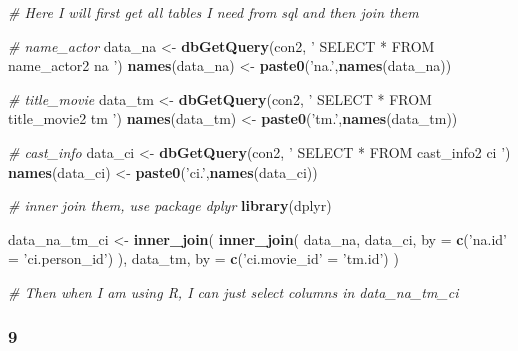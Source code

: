 \documentclass[]{article}
\newenvironment{Shaded}{\begin{snugshade}}{\end{snugshade}}
\newcommand{\KeywordTok}[1]{\textcolor[rgb]{0.13,0.29,0.53}{\textbf{{#1}}}}
\newcommand{\DataTypeTok}[1]{\textcolor[rgb]{0.13,0.29,0.53}{{#1}}}
\newcommand{\StringTok}[1]{\textcolor[rgb]{0.31,0.60,0.02}{{#1}}}
\newcommand{\CommentTok}[1]{\textcolor[rgb]{0.56,0.35,0.01}{\textit{{#1}}}}
\newcommand{\NormalTok}[1]{{#1}}
\begin{document}
\begin{Shaded}
\begin{Highlighting}[]
\CommentTok{# Here I will first get all tables I need from sql and then join them}

\CommentTok{# name_actor}
\NormalTok{data_na <-}\StringTok{ }
\StringTok{  }\KeywordTok{dbGetQuery}\NormalTok{(con2, }\StringTok{'}
\StringTok{                   SELECT *}
\StringTok{                   FROM name_actor2 na}
\StringTok{                   '}\NormalTok{)}
\KeywordTok{names}\NormalTok{(data_na) <-}\StringTok{ }\KeywordTok{paste0}\NormalTok{(}\StringTok{'na.'}\NormalTok{,}\KeywordTok{names}\NormalTok{(data_na))}

\CommentTok{# title_movie}
\NormalTok{data_tm <-}\StringTok{ }
\StringTok{  }\KeywordTok{dbGetQuery}\NormalTok{(con2, }\StringTok{'}
\StringTok{             SELECT *}
\StringTok{             FROM title_movie2 tm}
\StringTok{             '}\NormalTok{)}
\KeywordTok{names}\NormalTok{(data_tm) <-}\StringTok{ }\KeywordTok{paste0}\NormalTok{(}\StringTok{'tm.'}\NormalTok{,}\KeywordTok{names}\NormalTok{(data_tm))}

\CommentTok{# cast_info}
\NormalTok{data_ci <-}\StringTok{ }
\StringTok{  }\KeywordTok{dbGetQuery}\NormalTok{(con2, }\StringTok{'}
\StringTok{             SELECT *}
\StringTok{             FROM cast_info2 ci}
\StringTok{             '}\NormalTok{)}
\KeywordTok{names}\NormalTok{(data_ci) <-}\StringTok{ }\KeywordTok{paste0}\NormalTok{(}\StringTok{'ci.'}\NormalTok{,}\KeywordTok{names}\NormalTok{(data_ci))}

\CommentTok{# inner join them, use package dplyr}
\KeywordTok{library}\NormalTok{(dplyr)}

\NormalTok{data_na_tm_ci <-}\StringTok{ }
\StringTok{  }\KeywordTok{inner_join}\NormalTok{(}
    \KeywordTok{inner_join}\NormalTok{(}
      \NormalTok{data_na, data_ci, }\DataTypeTok{by =} \KeywordTok{c}\NormalTok{(}\StringTok{'na.id'} \NormalTok{=}\StringTok{ 'ci.person_id'}\NormalTok{)}
      \NormalTok{), }
    \NormalTok{data_tm, }\DataTypeTok{by =} \KeywordTok{c}\NormalTok{(}\StringTok{'ci.movie_id'} \NormalTok{=}\StringTok{ 'tm.id'}\NormalTok{)}
    \NormalTok{)}

\CommentTok{# Then when I am using R, I can just select columns in data_na_tm_ci}
\end{Highlighting}
\end{Shaded}

\subsubsection{9}\label{section-1}
\end{document}
